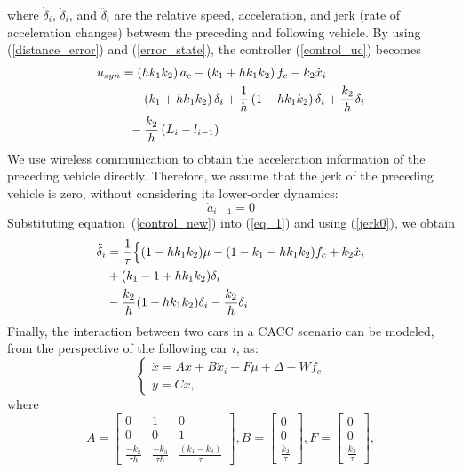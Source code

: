\documentclass[letterpaper, 10 pt, conference]{ieeeconf}  %
\def\eqref#1{(\ref{#1})}
\begin{document}
where $\dot{\delta}_{i}$, $\ddot{\delta}_{i}$, and $\dddot{\delta}_{i}$ are the relative speed, acceleration, and jerk (rate of acceleration changes) between the preceding and following vehicle. By using \eqref{distance_error} and \eqref{error_state}, the controller \eqref{control_uc} becomes 
\begin{align}\label{control_new}
        u_{s y n}&=\left(h k_1 k_2\right) a_c-\left(k_1+h k_1 k_2\right) f_c-k_2 \dot{x}_i \notag\\
       &~~ -\left(k_1+h k_1 k_2\right) \ddot{\delta}_i+\frac{1}{h}\left(1-h k_1 k_2\right) \dot{\delta}_i+\frac{k_2}{h} \delta_i \notag\\
       & ~~-\frac{k_2}{h}\left(L_i-l_{i-1}\right)
\end{align}
We use wireless communication to obtain the acceleration information of the preceding vehicle directly. Therefore, we assume that the jerk of the preceding vehicle is zero, without considering its lower-order dynamics:
\begin{equation}\label{jerk0}
    \dot{a}_{i-1} = 0    
\end{equation}
Substituting equation~\eqref{control_new} into \eqref{eq_1} and using \eqref{jerk0}, we obtain 
\begin{align}
    \ddot{\delta}_{i}&=\frac{1}{\tau}\Big\{(1-h k_{1}k_{2})\mu-(1-k_{1}-h k_{1}k_{2})f_{c}+k_{2}\dot{x}_{i}\notag\\
    &+(k_{1}-1+h k_{1}k_{2})\delta_{i}\notag\\ 
    &-\frac{k_{2}}{h}(1-h k_{1}k_{2})\delta_{i}-\frac{k_{2}}{h}\delta_{i}
    \end{align}
Finally, the interaction between two cars in a CACC scenario can be modeled, from the perspective of the following car $i$, as:
\begin{equation}\label{CACC}
      \left\{ \begin{array}{l}
        \dot{x}=A x+B \dot{x}_i+F \mu+\Delta-W f_c \\
         y = Cx,\end{array}\right.
\end{equation}  
where 
\begin{equation*}
        A  =\begin{bmatrix}
        0 & 1 & 0 \\
        0 & 0 & 1 \\
        \frac{-k_2}{\tau h} &  \frac{-k_3}{\tau h }& \frac{\left(k_1-k_3\right)}{\tau}
          \end{bmatrix},
        B =\begin{bmatrix}
        0 \\
        0 \\
        \frac{k_2}{\tau}
          \end{bmatrix}, 
          F=\begin{bmatrix}
        0 \\
        0 \\
       \frac{k_3}{\tau}
         \end{bmatrix},    \end{equation*}
\end{document}
